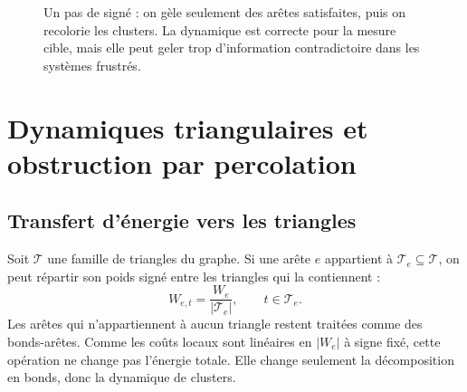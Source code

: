 \begin{figure}[H]
\centering
{}
\caption{Un pas de \SW{} signé : on gèle seulement des arêtes satisfaites, puis on recolorie les clusters. La dynamique est correcte pour la mesure cible, mais elle peut geler trop d'information contradictoire dans les systèmes frustrés.}
\label{fig:chapII_SW_step}
\end{figure}

\section{Dynamiques triangulaires et obstruction par percolation}
\label{sec:chapII_triangles_perco}

\subsection{Transfert d'énergie vers les triangles}

Soit $\mathcal T$ une famille de triangles du graphe. Si une arête $e$ appartient à $\mathcal T_e\subseteq\mathcal T$, on peut répartir son poids signé entre les triangles qui la contiennent :
\begin{equation}
    W_{e,t}=\frac{W_e}{|\mathcal T_e|},
    \qquad t\in\mathcal T_e.
    \label{eq:chapII_transfer_weight}
\end{equation}
Les arêtes qui n'appartiennent à aucun triangle restent traitées comme des bonds-arêtes. Comme les coûts locaux sont linéaires en $|W_e|$ à signe fixé, cette opération ne change pas l'énergie totale. Elle change seulement la décomposition en bonds, donc la dynamique de clusters.

